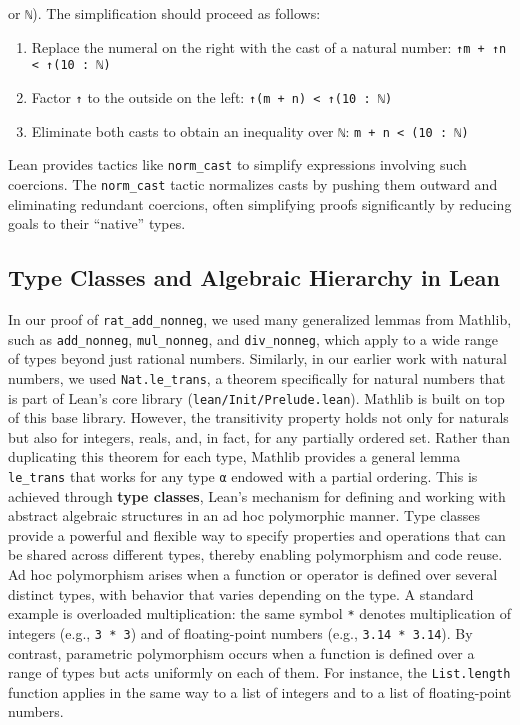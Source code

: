 or \lstinline[language=lean]|ℕ|). The simplification should proceed as follows:
\begin{enumerate}
  \item Replace the numeral on the right with the cast of a natural number:
        \lstinline[language=lean]|↑m + ↑n < ↑(10 : ℕ)|
  \item Factor \lstinline[language=lean]|↑| to the outside on the left:
        \lstinline[language=lean]|↑(m + n) < ↑(10 : ℕ)|
  \item Eliminate both casts to obtain an inequality over \lstinline[language=lean]|ℕ|:
        \lstinline[language=lean]|m + n < (10 : ℕ)|
\end{enumerate}
Lean provides tactics like \lstinline[language=lean]|norm_cast|
to simplify expressions involving such coercions.
The \lstinline[language=lean]|norm_cast| tactic normalizes casts
by pushing them outward and eliminating redundant coercions, often simplifying
proofs significantly by reducing goals to their ``native'' types.

\subsection{Type Classes and Algebraic Hierarchy in Lean}

In our proof of \lstinline[language=lean]|rat_add_nonneg|,
we used many generalized lemmas from Mathlib, such as \lstinline[language=lean]|add_nonneg|,
\lstinline[language=lean]|mul_nonneg|, and \lstinline[language=lean]|div_nonneg|,
which apply to a wide range of types beyond just rational numbers.
Similarly, in our earlier work with natural numbers, we used \lstinline[language=lean]|Nat.le_trans|,
a theorem specifically for natural numbers that is part of Lean's core library
(\lstinline[language=lean]|lean/Init/Prelude.lean|). Mathlib is built on top of this base library.
However, the transitivity property holds not only for naturals but also for integers,
reals, and, in fact, for any partially ordered set.
Rather than duplicating this theorem for each type, Mathlib provides a general
lemma \lstinline[language=lean]|le_trans| that works for any type \lstinline[language=lean]|α|
endowed with a partial ordering.
This is achieved through \textbf{type classes}, Lean's mechanism for defining and working with
abstract algebraic structures in an ad hoc polymorphic manner.
Type classes provide a powerful and flexible way to specify properties and operations that can be
shared across different types, thereby enabling polymorphism and code reuse. Ad hoc polymorphism
arises when a function or operator is defined over several distinct types, with behavior that varies
depending on the type.
A standard example \cite{wadler_blott_ad_hoc_polymorphism_1988} is overloaded multiplication:
the same symbol \lstinline[language=lean]|*| denotes multiplication of integers
(e.g., \lstinline[language=lean]|3 * 3|) and of floating-point numbers
(e.g., \lstinline[language=lean]|3.14 * 3.14|).
By contrast, parametric polymorphism occurs when a function is defined over a range of types
but acts uniformly on each of them. For instance, the \lstinline[language=lean]|List.length|
function applies in the same way to a list of integers and to a list of floating-point numbers.

